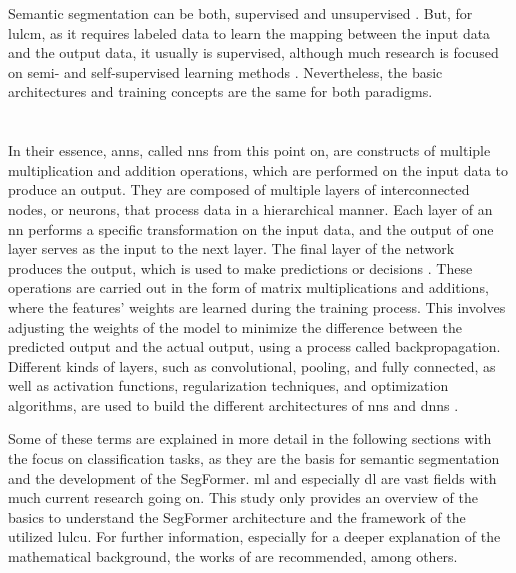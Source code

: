 Semantic segmentation can be both, supervised and unsupervised \autocite{Guo.Liu.ea2018,Hamilton.Zhang.ea2022,Zhao.Tu.ea2023}. But, for \gls{lulcm}, as it requires labeled data to learn the mapping between the input data and the output data, it usually is supervised, although much research is focused on semi- and self-supervised learning methods \autocite{Guo.Liu.ea2018,Li.Cai.ea2024}. Nevertheless, the basic architectures and training concepts are the same for both paradigms. 

\section{}

In their essence, \glspl{ann}, called \glspl{nn} from this point on, are constructs of multiple multiplication and addition operations, which are performed on the input data to produce an output. They are composed of multiple layers of interconnected nodes, or neurons, that process data in a hierarchical manner. Each layer of an \gls{nn} performs a specific transformation on the input data, and the output of one layer serves as the input to the next layer. The final layer of the network produces the output, which is used to make predictions or decisions \autocite{Goodfellow.Bengio.ea2016}. These operations are carried out in the form of matrix multiplications and additions, where the features' weights are learned during the training process. This involves adjusting the weights of the model to minimize the difference between the predicted output and the actual output, using a process called backpropagation. Different kinds of layers, such as convolutional, pooling, and fully connected, as well as activation functions, regularization techniques, and optimization algorithms, are used to build the different architectures of \glspl{nn} and \glspl{dnn} \autocite{Goodfellow.Bengio.ea2016,LeCun.Bengio.ea2015,Szeliski2022,Zhang.Lipton.ea2023}.

Some of these terms are explained in more detail in the following sections with the focus on classification tasks, as they are the basis for semantic segmentation and the development of the SegFormer. \gls{ml} and especially \gls{dl} are vast fields with much current research going on. This study only provides an overview of the basics to understand the SegFormer architecture and the framework of the utilized \gls{lulcu}. For further information, especially for a deeper explanation of the mathematical background, the works of \textcite{Bernard2021,Bishop2006,Goodfellow.Bengio.ea2016,Nielsen2015,Zhang.Lipton.ea2023} are recommended, among others.

